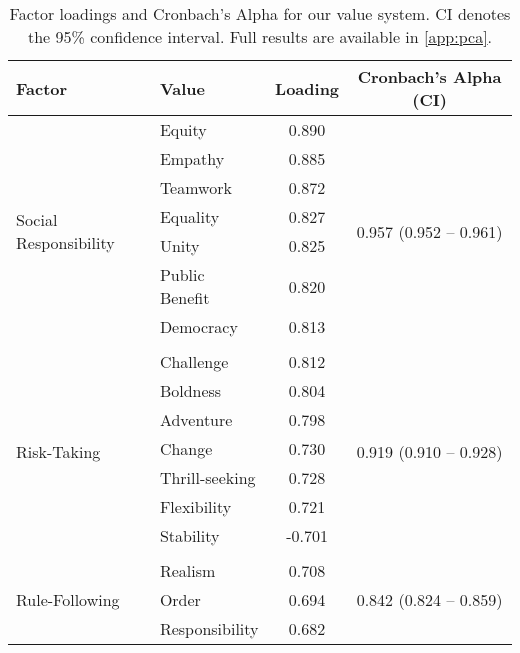 \begin{table}[h!]
    \centering
    \caption{Factor loadings and Cronbach's Alpha for our value system. CI denotes the 95\% confidence interval. Full results are available in \cref{app:pca}.}
    \begin{tabular}{llcc}
        \toprule
        Factor & Value & Loading & Cronbach's Alpha (CI) \\
        \midrule
        \multirow{8}{*}{Social Responsibility}
                                  & Equity        & 0.890 & \multirow{8}{*}{0.957 (0.952 -- 0.961)}\\
                                  & Empathy       & 0.885 & \\
                                  & Teamwork     & 0.872 & \\
                                  & Equality     & 0.827 & \\
                                  & Unity        & 0.825 & \\
                                  & Public Benefit  & 0.820 & \\
                                  & Democracy  & 0.813 & \\
                                  \multicolumn{4}{c}{\textit{...}} \\
        \midrule
        \multirow{8}{*}{Risk-Taking} 
                                  & Challenge      & 0.812 & \multirow{8}{*}{0.919 (0.910 -- 0.928)} \\
                                  & Boldness     & 0.804 & \\
                                  & Adventure     & 0.798 & \\
                                  & Change   & 0.730 & \\
                                  & Thrill-seeking & 0.728 & \\
                                  & Flexibility & 0.721 & \\
                                  & Stability  & -0.701 & \\
                                  \multicolumn{4}{c}{\textit{...}} \\
        \midrule
        \multirow{8}{*}{Rule-Following}
                                  &  Realism    & 0.708 & \multirow{8}{*}{0.842 (0.824 -- 0.859)} \\
                                  &  Order      & 0.694 & \\
                                  &  Responsibility  & 0.682 & \\

\end{tabular}
\end{table}
